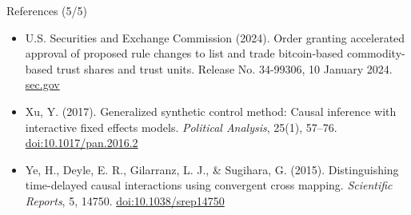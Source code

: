 \begin{frame}{References (5/5)}
\begin{itemize}
    \item U.S. Securities and Exchange Commission (2024). Order granting accelerated approval of proposed rule changes to list and trade bitcoin-based commodity-based trust shares and trust units. Release No. 34-99306, 10 January 2024. \href{https://www.sec.gov/files/rules/sro/nysearca/2024/34-99306.pdf}{sec.gov}
    \item Xu, Y. (2017). Generalized synthetic control method: Causal inference with interactive fixed effects models. \textit{Political Analysis}, 25(1), 57--76. \href{https://doi.org/10.1017/pan.2016.2}{doi:10.1017/pan.2016.2}
    \item Ye, H., Deyle, E. R., Gilarranz, L. J., \& Sugihara, G. (2015). Distinguishing time-delayed causal interactions using convergent cross mapping. \textit{Scientific Reports}, 5, 14750. \href{https://doi.org/10.1038/srep14750}{doi:10.1038/srep14750}
\end{itemize}
\end{frame}


